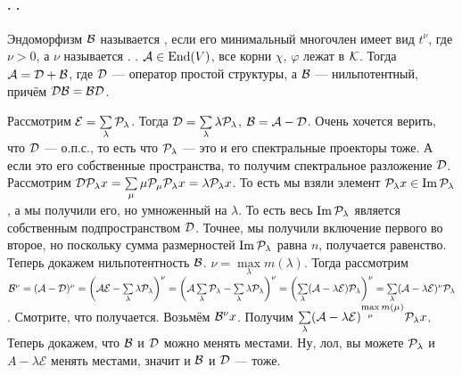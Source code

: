 \documentclass{article}
\DeclareMathOperator{\operIm}{Im}
\let\Im\operIm
\newcommand{\id}{{\mathcal{E}}}
\begin{document}
    \paragraph{. .}
    \begin{itemize}
        \dfn Эндоморфизм ${\mathcal{B}}$ называется , если его минимальный многочлен имеет вид $t^\nu$, где $\nu>0$, а $\nu$ называется .
        \thm {}. ${\mathcal{A}}\in\operatorname{End}(V)$, все корни $\chi$, $\varphi$ лежат в ${\mathcal{K}}$. Тогда ${\mathcal{A}}={\mathcal{D}}+{\mathcal{B}}$, где ${\mathcal{D}}$ --- оператор простой структуры, а ${\mathcal{B}}$ --- нильпотентный, причём ${\mathcal{D}}{\mathcal{B}}={\mathcal{B}}{\mathcal{D}}$.
        \begin{Proof}
            Рассмотрим $\id=\sum\limits_{\lambda}\scriptP_\lambda$. Тогда ${\mathcal{D}}=\sum\limits_{\lambda}\lambda{\mathcal{P}}_\lambda$, ${\mathcal{B}}={\mathcal{A}}-{\mathcal{D}}$. Очень хочется верить, что ${\mathcal{D}}$ --- о.п.с., то есть что ${\mathcal{P}}_\lambda$ --- это и его спектральные проекторы тоже. А если это его собственные пространства, то получим спектральное разложение ${\mathcal{D}}$. Рассмотрим ${\mathcal{D}}{\mathcal{P}}_\lambda x=\sum\limits_{\mu}\mu{\mathcal{P}}_\mu{\mathcal{P}}_\lambda x=\lambda{\mathcal{P}}_\lambda x$. То есть мы взяли элемент $\scriptP_\lambda x\in\Im\scriptP_\lambda$, а мы получили его, но умноженный на $\lambda$. То есть весь $\Im\scriptP_\lambda$ является собственным подпространством ${\mathcal{D}}$. Точнее, мы получили включение первого во второе, но поскольку сумма размерностей $\Im\scriptP_\lambda$ равна $n$, получается равенство.\\
            Теперь докажем нильпотентность ${\mathcal{B}}$. $\nu=\max\limits_{\lambda}m(\lambda)$. Тогда рассмотрим $\scriptB^\nu=(\scriptA-\scriptD)^\nu=\left(\scriptA\id-\sum\limits_{\lambda}\lambda\scriptP_\lambda\right)^\nu=\left(\scriptA\sum\limits_{\lambda}\scriptP_\lambda-\sum\limits_{\lambda}\lambda\scriptP_\lambda\right)^\nu=
            \left(\sum\limits_{\lambda}(\scriptA-\lambda\id)\scriptP_\lambda\right)^\nu=\sum\limits_{\lambda}(\scriptA-\lambda\id)^\nu\scriptP_\lambda$. Смотрите, что получается. Возьмём ${\mathcal{B}}^\nu x$. Получим $\sum\limits_{\lambda}(\scriptA-\lambda\id)^{\max\limits_{\mu}m(\mu)}\scriptP_\lambda x$.\\
            Теперь докажем, что ${\mathcal{B}}$ и ${\mathcal{D}}$ можно менять местами. Ну, лол, вы можете ${\mathcal{P}}_\lambda$ и $A-\lambda\id$ менять местами, значит и ${\mathcal{B}}$ и ${\mathcal{D}}$ --- тоже.

\end{Proof}
\end{itemize}
\end{document}
